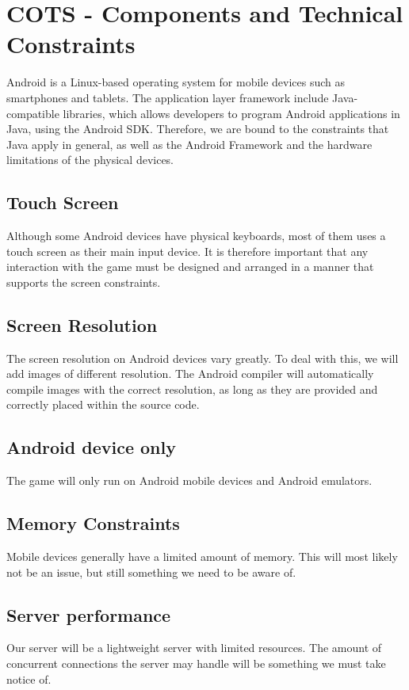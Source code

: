 \section{COTS - Components and Technical Constraints}
\label{sec:COTS}
Android is a Linux-based operating system for mobile devices such as
smartphones and tablets. The application layer framework include
Java-compatible libraries, which allows developers to program Android
applications in Java, using the Android SDK. Therefore, we are bound to the
constraints that Java apply in general, as well as the Android Framework and
the hardware limitations of the physical devices.

\subsection{Touch Screen}
Although some Android devices have physical keyboards, most of them uses a
touch screen as their main input device. It is therefore important that any
interaction with the game must be designed and arranged in a manner that
supports the screen constraints. 

\subsection{Screen Resolution}
The screen resolution on Android devices vary greatly. To deal with this, we
will add images of different resolution. The Android compiler will
automatically compile images with the correct resolution, as long as they are
provided and correctly placed within the source code.

\subsection{Android device only}
The game will only run on Android mobile devices and Android emulators.

\subsection{Memory Constraints}
Mobile devices generally have a limited amount of memory. This will most likely
not be an issue, but still something we need to be aware of.

\subsection{Server performance}
Our server will be a lightweight server with limited resources. The amount of
concurrent connections the server may handle will be something we must take
notice of.